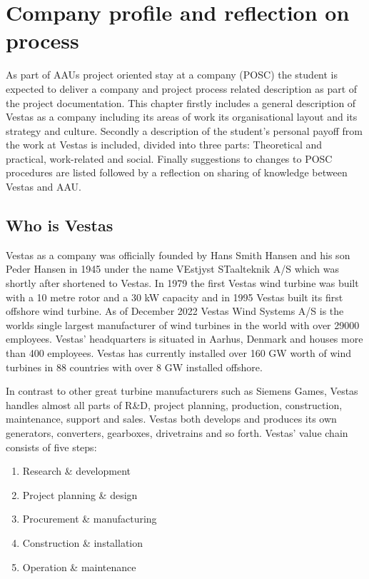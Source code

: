 \section{Company profile and reflection on process} \label{company}
As part of AAUs project oriented stay at a company (POSC) the student is expected to deliver a company and project process related description as part of the project documentation. This chapter firstly includes a general description of Vestas as a company including its areas of work its organisational layout and its strategy and culture. Secondly a description of the student's personal payoff from the work at Vestas is included, divided into three parts: Theoretical and practical, work-related and social. Finally suggestions to changes to POSC procedures are listed followed by a reflection on sharing of knowledge between Vestas and AAU.


\subsection{Who is Vestas}
Vestas as a company was officially founded by Hans Smith Hansen and his son Peder Hansen in 1945 under the name VEstjyst STaalteknik A/S which was shortly after shortened to Vestas. In 1979 the first Vestas wind turbine was built with a 10 metre rotor and a 30 kW capacity and in 1995 Vestas built its first offshore wind turbine. As of December 2022 Vestas Wind Systems A/S is the worlds single largest manufacturer of wind turbines in the world with over 29000 employees. Vestas' headquarters is situated in Aarhus, Denmark and houses more than 400 employees. Vestas has currently installed over 160 GW worth of wind turbines in 88 countries with over 8 GW installed offshore.

\smallskip
In contrast to other great turbine manufacturers such as Siemens Games, Vestas handles almost all parts of R\&D, project planning, production, construction, maintenance, support and sales. Vestas both develops and produces its own generators, converters, gearboxes, drivetrains and so forth. Vestas' value chain consists of five steps:
\begin{enumerate}
	\item Research \& development
	\item Project planning \& design
	\item Procurement \& manufacturing
	\item Construction \& installation
	\item Operation \& maintenance
\end{enumerate}

